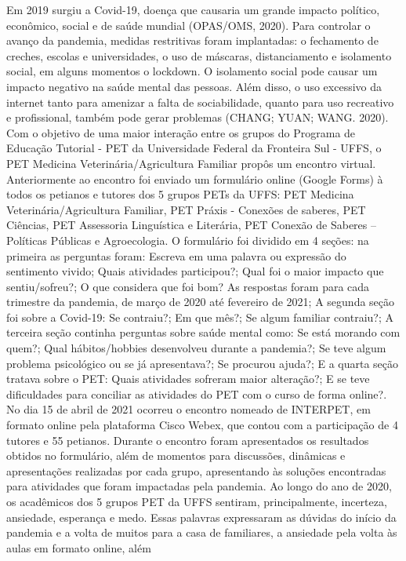 Em 2019 surgiu a Covid-19, doença que causaria um grande impacto político, econômico, 
social e de saúde mundial (OPAS/OMS, 2020). Para controlar o avanço da pandemia, medidas 
restritivas foram implantadas: o fechamento de creches, escolas e universidades, o uso de máscaras, 
distanciamento e isolamento social, em alguns momentos o lockdown.
O isolamento social pode causar um impacto negativo na saúde mental das pessoas. Além 
disso, o uso excessivo da internet tanto para amenizar a falta de sociabilidade, quanto para uso 
recreativo e profissional, também pode gerar problemas (CHANG; YUAN; WANG. 2020).
Com o objetivo de uma maior interação entre os grupos do Programa de Educação Tutorial -
PET da Universidade Federal da Fronteira Sul - UFFS, o PET Medicina Veterinária/Agricultura 
Familiar propôs um encontro virtual. Anteriormente ao encontro foi enviado um formulário online 
(Google Forms) à todos os petianos e tutores dos 5 grupos PETs da UFFS: PET Medicina 
Veterinária/Agricultura Familiar, PET Práxis - Conexões de saberes, PET Ciências, PET Assessoria 
Linguística e Literária, PET Conexão de Saberes – Políticas Públicas e Agroecologia.
O formulário foi dividido em 4 seções: na primeira as perguntas foram: Escreva em uma 
palavra ou expressão do sentimento vivido; Quais atividades participou?; Qual foi o maior impacto 
que sentiu/sofreu?; O que considera que foi bom? As respostas foram para cada trimestre da pandemia, 
de março de 2020 até fevereiro de 2021; A segunda seção foi sobre a Covid-19: Se contraiu?; Em que 
mês?; Se algum familiar contraiu?; A terceira seção continha perguntas sobre saúde mental como: Se 
está morando com quem?; Qual hábitos/hobbies desenvolveu durante a pandemia?; Se teve algum 
problema psicológico ou se já apresentava?; Se procurou ajuda?; E a quarta seção tratava sobre o PET: 
Quais atividades sofreram maior alteração?; E se teve dificuldades para conciliar as atividades do PET 
com o curso de forma online?.
No dia 15 de abril de 2021 ocorreu o encontro nomeado de INTERPET, em formato online 
pela plataforma Cisco Webex, que contou com a participação de 4 tutores e 55 petianos.
Durante o encontro foram apresentados os resultados obtidos no formulário, além de 
momentos para discussões, dinâmicas e apresentações realizadas por cada grupo, apresentando às 
soluções encontradas para atividades que foram impactadas pela pandemia.
Ao longo do ano de 2020, os acadêmicos dos 5 grupos PET da UFFS sentiram, principalmente, 
incerteza, ansiedade, esperança e medo. Essas palavras expressaram as dúvidas do início da pandemia 
e a volta de muitos para a casa de familiares, a ansiedade pela volta às aulas em formato online, além 
